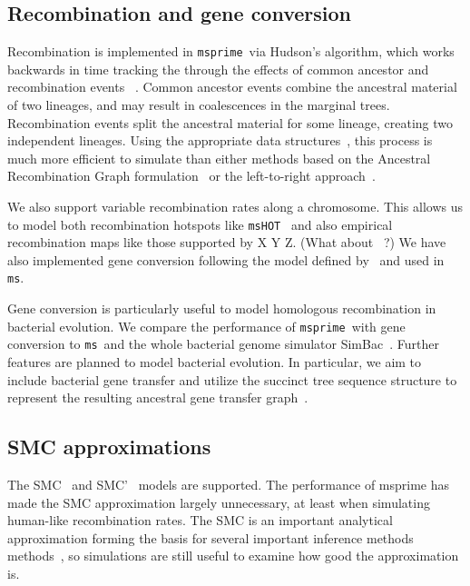 \documentclass{article}
\newcommand{\msprime}[0]{\texttt{msprime}}
\newcommand{\ms}[0]{\texttt{ms}}
\begin{document}
\subsection*{Recombination and gene conversion}
Recombination is implemented in \msprime\ via
Hudson's algorithm, which
works backwards in time tracking the
through the effects of common ancestor and recombination events
~\citep{hudson1983properties,hudson1990gene,kelleher2016efficient}. Common
ancestor events combine the ancestral material of two lineages, and may
 result in coalescences in the marginal trees. Recombination events
split the ancestral material for some lineage, creating two independent
lineages. Using the appropriate data structures~\citep{kelleher2016efficient},
this process is much more efficient to simulate than either
methods based on the Ancestral Recombination Graph
formulation~\citep{griffiths1991two,griffiths1997ancestral}
or the left-to-right approach~\citep{wiuf1999recombination,wiuf1999ancestry}.


We also support variable recombination rates along a chromosome.
This allows us to model both recombination hotspots like
\texttt{msHOT}~\citep{hellenthal2007mshot} and also empirical
recombination maps like those supported by X Y Z.
(What about ~\cite{wang2014new}?)
We have also implemented gene
conversion following the model defined by~\cite{wiuf2000coalescent}
and used in \ms.

Gene conversion is particularly useful to model homologous recombination in bacterial evolution.
We compare the performance of \msprime\ with gene conversion to \ms\ and
the whole bacterial genome simulator SimBac~\citep{brown2016simbac}.
Further features are planned to model bacterial evolution. In particular, we
aim to include bacterial gene transfer and utilize the succinct tree sequence structure
to represent the resulting ancestral gene transfer graph~\citep{baumdicker2014AGTG}.

\subsection*{SMC approximations}

The SMC~\citep{mcvean2005approximating} and SMC'~\citep{marjoram2006fast}
models are supported.
The performance of msprime has made the SMC
approximation largely unnecessary, at least when simulating human-like
recombination rates. The SMC is an important analytical approximation
forming the basis for several important inference methods
methods~\citep{
li2011inference,
harris2013inferring,
sheehan2013estimating,
schiffels2014inferring,
carmi2014renewal,
rasmussen2014genome,
zheng2014bayesian,
terhorst2017robust},
so simulations are still useful to examine  how good the approximation
is.
\end{document}
